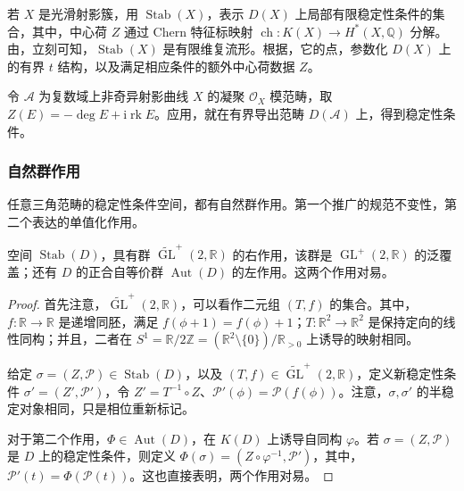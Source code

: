 若 $X$ 是光滑射影簇，用 $\operatorname{Stab}(X)$，表示 $D(X)$ 上局部有限稳定性条件的集合，其中，中心荷 $Z$ 通过 Chern 特征标映射 $\operatorname{ch}\colon K(X)\to H^*(X,\mathbb{Q})$ 分解。由，立刻可知，$\operatorname{Stab}(X)$ 是有限维复流形。根据，它的点，参数化 $D(X)$ 上的有界 $t$ 结构，以及满足相应条件的额外中心荷数据 $Z$。

\begin{example}\label{ex:5.38}
令 $\mathcal{A}$ 为复数域上非奇异射影曲线 $X$ 的凝聚 $\mathcal{O}_X$ 模范畴，取 $Z(E)=-\deg E+\mathrm{i}\operatorname{rk}E$。应用，就在有界导出范畴 $D(\mathcal{A})$ 上，得到稳定性条件。
\end{example}

\subsubsection{自然群作用}\label{sec:5.7.2.1}

任意三角范畴的稳定性条件空间，都有自然群作用。第一个推广的规范不变性，第二个表达的单值化作用。
\begin{lemma}\label{lem:5.39}
空间 $\operatorname{Stab}(D)$，具有群 $\widetilde{\operatorname{GL}}^{+}(2,\mathbb{R})$ 的右作用，该群是 $\operatorname{GL}^{+}(2,\mathbb{R})$ 的泛覆盖；还有 $D$ 的正合自等价群 $\operatorname{Aut}(D)$ 的左作用。这两个作用对易。
\end{lemma}

\begin{proof}
首先注意，$\widetilde{\operatorname{GL}}^{+}(2,\mathbb{R})$，可以看作二元组 $(T,f)$ 的集合。其中，$f\colon\mathbb{R}\to\mathbb{R}$ 是递增同胚，满足 $f(\phi+1)=f(\phi)+1$；$T\colon\mathbb{R}^2\to\mathbb{R}^2$ 是保持定向的线性同构；并且，二者在 $S^1=\mathbb{R}/2\mathbb{Z}=(\mathbb{R}^2\setminus\{0\})/\mathbb{R}_{>0}$ 上诱导的映射相同。

给定 $\sigma=(Z,\mathcal{P})\in\operatorname{Stab}(D)$，以及 $(T,f)\in\widetilde{\operatorname{GL}}^{+}(2,\mathbb{R})$，定义新稳定性条件 $\sigma'=(Z',\mathcal{P}')$，令 $Z'=T^{-1}\circ Z$、$\mathcal{P}'(\phi)=\mathcal{P}(f(\phi))$。注意，$\sigma,\sigma'$ 的半稳定对象相同，只是相位重新标记。

对于第二个作用，$\Phi\in\operatorname{Aut}(D)$，在 $K(D)$ 上诱导自同构 $\varphi$。若 $\sigma=(Z,\mathcal{P})$ 是 $D$ 上的稳定性条件，则定义 $\Phi(\sigma)=(Z\circ\varphi^{-1},\mathcal{P}')$，其中，$\mathcal{P}'(t)=\Phi(\mathcal{P}(t))$。这也直接表明，两个作用对易。
\end{proof}

